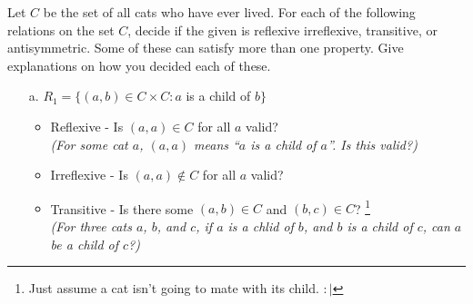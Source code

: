 \documentclass[a4paper,12pt]{book}
\newcounter{question}
\begin{document}
    \begin{questionNOGRADE}{\thequestion}

    
        Let $C$ be the set of all cats who have ever lived. For each of the
        following relations on the set $C$, decide if the given is
        reflexive irreflexive, transitive, or antisymmetric.
        Some of these can satisfy more than one property. Give
        explanations on how you decided each of these.
        

        \begin{itemize}
            \item[a.]   $R_{1} = \{ (a, b) \in C \times C : a$ is a child of $b \}$

                \begin{itemize}
                    \item   Reflexive - Is $(a,a) \in C$ for all $a$ valid?
                            \\ \textit{(For some cat $a$, $(a,a)$ means ``$a$ is a child of $a$''. Is this valid?)}

                    \item   Irreflexive - Is $(a,a) \not\in C$ for all $a$ valid?

                    \item   Transitive - Is there some $(a,b) \in C$ and $(b,c) \in C$?
                            \footnote{Just assume a cat isn't going to mate with its child. $:|$}
                            \\ \textit{(For three cats $a$, $b$, and $c$, if $a$ is a chlid of $b$,
                            and $b$ is a child of $c$, can $a$ be a child of $c$?)}


\end{itemize}
\end{itemize}
\end{questionNOGRADE}
\end{document}

